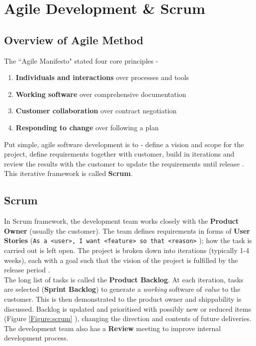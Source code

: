 \section{Agile Development \& Scrum}

\subsection{Overview of Agile Method}

The “Agile Manifesto" \cite{beck:2001} stated four core principles - 

\begin{enumerate}
	\item \textbf{Individuals and interactions} over processes and tools
	\item \textbf{Working software} over comprehensive documentation
	\item \textbf{Customer collaboration} over contract negotiation
	\item \textbf{Responding to change} over following a plan
\end{enumerate}

Put simple, agile software development is to - define a vision and scope for the project, define requirements together with customer, build in iterations and review the results with the customer to update the requirements until release \cite{Inayat:2015}. This iterative framework is called \textbf{Scrum}.

\subsection{Scrum}

In Scrum framework, the development team works closely with the \textbf{Product Owner} (usually the customer). The team defines requirements in forms of \textbf{User Stories} (\texttt{As a <user>, I want <feature> so that <reason>} \cite{Rees:2002}); how the task is carried out is left open. The project is broken down into iterations (typically 1-4 weeks), each with a goal such that the vision of the project is fulfilled by the release period \cite{Schwaber:1997}.\\

The long list of tasks is called the \textbf{Product Backlog}. At each iteration, tasks are selected (\textbf{Sprint Backlog}) to generate a \textit{working} software of \textit{value} to the customer. This is then demonstrated to the product owner and shippability is discussed. Backlog is updated and prioritised with possibly new or reduced items (Figure \ref{Figure:scrum} \cite{Schwaber:1997}), changing the direction and contents of future deliveries. The development team also has a \textbf{Review} meeting to improve internal development process.\\

